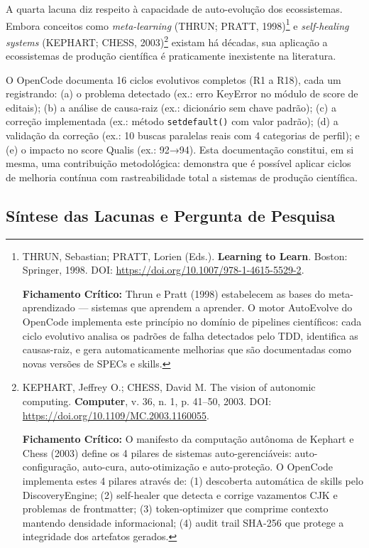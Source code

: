 A quarta lacuna diz respeito à capacidade de auto-evolução dos ecossistemas. Embora conceitos como \textit{meta-learning} (THRUN; PRATT, 1998)\footnote{
  THRUN, Sebastian; PRATT, Lorien (Eds.). \textbf{Learning to Learn}. Boston: Springer, 1998. DOI: \url{https://doi.org/10.1007/978-1-4615-5529-2}.

  \textbf{Fichamento Crítico:} Thrun e Pratt (1998) estabelecem as bases do meta-aprendizado --- sistemas que aprendem a aprender. O motor AutoEvolve do OpenCode implementa este princípio no domínio de pipelines científicos: cada ciclo evolutivo analisa os padrões de falha detectados pelo TDD, identifica as causas-raiz, e gera automaticamente melhorias que são documentadas como novas versões de SPECs e skills.
} e \textit{self-healing systems} (KEPHART; CHESS, 2003)\footnote{
  KEPHART, Jeffrey O.; CHESS, David M. The vision of autonomic computing. \textbf{Computer}, v. 36, n. 1, p. 41--50, 2003. DOI: \url{https://doi.org/10.1109/MC.2003.1160055}.

  \textbf{Fichamento Crítico:} O manifesto da computação autônoma de Kephart e Chess (2003) define os 4 pilares de sistemas auto-gerenciáveis: auto-configuração, auto-cura, auto-otimização e auto-proteção. O OpenCode implementa estes 4 pilares através de: (1) descoberta automática de skills pelo DiscoveryEngine; (2) self-healer que detecta e corrige vazamentos CJK e problemas de frontmatter; (3) token-optimizer que comprime contexto mantendo densidade informacional; (4) audit trail SHA-256 que protege a integridade dos artefatos gerados.
} existam há décadas, sua aplicação a ecossistemas de produção científica é praticamente inexistente na literatura.

O OpenCode documenta 16 ciclos evolutivos completos (R1 a R18), cada um registrando: (a) o problema detectado (ex.: erro KeyError no módulo de score de editais); (b) a análise de causa-raiz (ex.: dicionário sem chave padrão); (c) a correção implementada (ex.: método \texttt{setdefault()} com valor padrão); (d) a validação da correção (ex.: 10 buscas paralelas reais com 4 categorias de perfil); e (e) o impacto no score Qualis (ex.: 92→94). Esta documentação constitui, em si mesma, uma contribuição metodológica: demonstra que é possível aplicar ciclos de melhoria contínua com rastreabilidade total a sistemas de produção científica.

\subsection{Síntese das Lacunas e Pergunta de Pesquisa}

